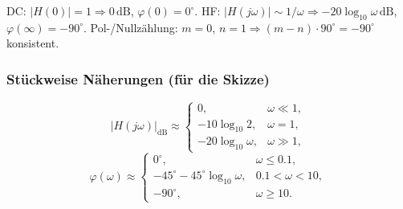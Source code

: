 \begin{description}[leftmargin=1.2em,labelsep=.6em,font=\bfseries]
\item[9. Grenzwerte und Konsistenz prüfen.]
DC: \(|H(0)|=1\Rightarrow 0\,\mathrm{dB}\), \(\varphi(0)=0^\circ\).
HF: \(|H(j\omega)|\sim 1/\omega\Rightarrow -20\log_{10}\omega\,\mathrm{dB}\), \(\varphi(\infty)=-90^\circ\).
Pol-/Nullzählung: \(m=0\), \(n=1\Rightarrow (m-n)\cdot90^\circ=-90^\circ\) konsistent.

\end{description}

\subsubsection*{Stückweise Näherungen (für die Skizze)}
\[
|H(j\omega)|_{\mathrm{dB}}\approx
\begin{cases}
0,& \omega\ll 1,\\[2pt]
-10\log_{10}2,& \omega=1,\\[2pt]
-20\log_{10}\omega,& \omega\gg 1,
\end{cases}
\]\[
\varphi(\omega)\approx
\begin{cases}
0^\circ,& \omega\le 0.1,\\[2pt]
-45^\circ-45^\circ\log_{10}\omega,& 0.1<\omega<10,\\[2pt]
-90^\circ,& \omega\ge 10.
\end{cases}
\]

\newpage